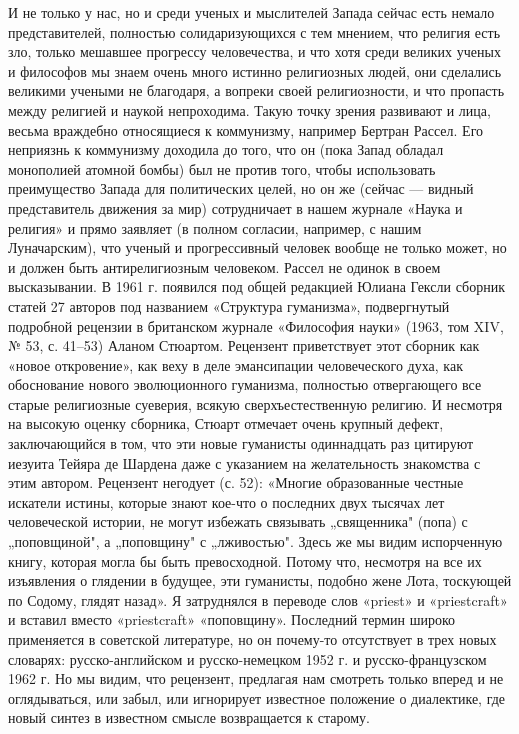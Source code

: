 И не только у нас, но и среди ученых и мыслителей Запада сейчас есть немало
представителей, полностью солидаризующихся с тем мнением, что религия есть зло,
только мешавшее прогрессу человечества, и что хотя среди великих ученых и
философов мы знаем очень много истинно религиозных людей, они сделались
великими учеными не благодаря, а вопреки своей религиозности, и что пропасть
между религией и наукой непроходима. Такую точку зрения развивают и лица,
весьма враждебно относящиеся к коммунизму, например Бертран Рассел. Его
неприязнь к коммунизму доходила до того, что он (пока Запад обладал монополией
атомной бомбы) был не против того, чтобы использовать преимущество Запада для
политических целей, но он же (сейчас --- видный представитель движения за мир)
сотрудничает в нашем журнале «Наука и религия» и прямо заявляет (в полном
согласии, например, с нашим Луначарским), что ученый и прогрессивный человек
вообще не только может, но и должен быть антирелигиозным человеком. Рассел не
одинок в своем высказывании. В 1961 г. появился под общей редакцией Юлиана
Гексли сборник статей 27 авторов под названием «Структура гуманизма»,
подвергнутый подробной рецензии в британском журнале «Философия науки» (1963,
том XIV, № 53, с. 41--53) Аланом Стюартом. Рецензент приветствует этот сборник
как «новое откровение», как веху в деле эмансипации человеческого духа, как
обоснование нового эволюционного гуманизма, полностью отвергающего все старые
религиозные суеверия, всякую сверхъестественную религию. И несмотря на высокую
оценку сборника, Стюарт отмечает очень крупный дефект, заключающийся в том, что
эти новые гуманисты одиннадцать раз цитируют иезуита Тейяра де Шардена даже с
указанием на желательность знакомства с этим автором. Рецензент негодует (с.
52): «Многие образованные честные искатели истины, которые знают кое-что о
последних двух тысячах лет человеческой истории, не могут избежать связывать
„священника" (попа) с „поповщиной", а „поповщину" с „лживостью". Здесь же мы
видим испорченную книгу, которая могла бы быть превосходной. Потому что,
несмотря на все их изъявления о глядении в будущее, эти гуманисты, подобно жене
Лота, тоскующей по Содому, глядят назад». Я затруднялся в переводе слов
«priest» и «priestcraft» и вставил вместо «priestcraft» «поповщину». Последний
термин широко применяется в советской литературе, но он почему-то отсутствует в
трех новых словарях: русско-английском и русско-немецком 1952 г. и
русско-французском 1962 г. Но мы видим, что рецензент, предлагая нам смотреть
только вперед и не оглядываться, или забыл, или игнорирует известное положение
о диалектике, где новый синтез в известном смысле возвращается к старому.


